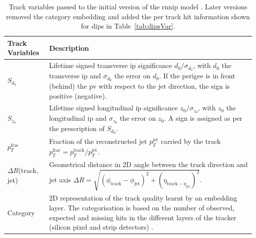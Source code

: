 \begin{table}[h!]
  \begin{center}
      \begin{tabular}{C{3cm}|C{13cm}} 
      	 \hline \hline
          Track Variables & Description  \\ \hline \hline
          $S_{d_0}$      & Lifetime signed transverse \gls{ip} significance $d_0 / \sigma_{d_0}$, with $d_0$ the transverse \gls{ip} and $\sigma_{d_0}$ the error on $d_0$. If the perigee is in front (behind) the \gls{pv} with respect to the jet direction, the sign is positive (negative). \\ \hline
          $S_{z_0}$      & Lifetime signed longitudinal \gls{ip} significance $z_0 / \sigma_{z_0}$, with $z_0$ the longitudinal \gls{ip} and $\sigma_{z_0}$ the error on $z_0$. A sign is assigned as per the prescription of $S_{d_0}$. \\ \hline
          $p_T^{\textrm{frac}}$   & Fraction of the reconstructed jet $p_T^{\textrm{jet}}$ carried by the track $p_T^{\textrm{frac}} = p_T^{\textrm{track}} / p_T^{\textrm{jet}}$. \\ \hline
          $\Delta R$(track, jet) & Geometrical distance in 2D angle between the track direction and jet axis $\Delta R = \sqrt{(\phi_{\textrm{track}} - \phi_{\textrm{jet}})^2 + (\eta_{\textrm{track} - \eta_{\textrm{jet}}})^2}$. \\ \hline
          Category       & 2D representation of the track quality learnt by an embedding layer. The categorisation is based on the number of observed, expected and missing hits in the different layers of the tracker (silicon pixel and strip detectors) \cite{ATL-PHYS-PUB-2015-022}.  \\ \hline
      \end{tabular}
    \caption{Track variables passed to the initial version of the \gls{rnnip} model \cite{ATL-PHYS-PUB-2017-003}. Later versions removed the category embedding and added the per track hit information shown for \gls{dips} in Table~\ref{tab:dipsVar}.}
    \label{tab:rnnipVar}
  \end{center}
\end{table}

